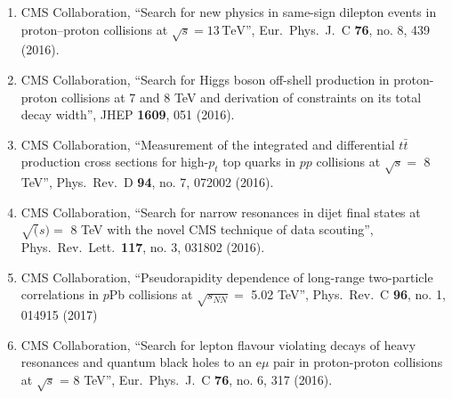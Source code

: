 \begin{itemize}
\begin{enumerate}
\item CMS Collaboration, ``Search for new physics in same-sign dilepton events in proton–proton collisions at $\sqrt{s} = 13\,\text {TeV} $'', Eur.\ Phys.\ J.\ C {\bf 76}, no. 8, 439 (2016).

\item CMS Collaboration, ``Search for Higgs boson off-shell production in proton-proton collisions at 7 and 8 TeV and derivation of constraints on its total decay width'', JHEP {\bf 1609}, 051 (2016).

\item CMS Collaboration, ``Measurement of the integrated and differential $t \bar t$ production cross sections for high-$p_t$ top quarks in $pp$ collisions at $\sqrt s =$ 8 TeV'', Phys.\ Rev.\ D {\bf 94}, no. 7, 072002 (2016).

\item CMS Collaboration, ``Search for narrow resonances in dijet final states at $\sqrt(s)=$ 8 TeV with the novel CMS technique of data scouting'', Phys.\ Rev.\ Lett.\  {\bf 117}, no. 3, 031802 (2016).

\item CMS Collaboration, ``Pseudorapidity dependence of long-range two-particle correlations in $p$Pb collisions at $\sqrt {s_{NN}}=$ 5.02 TeV'', Phys.\ Rev.\ C {\bf 96}, no. 1, 014915 (2017)

\item CMS Collaboration, ``Search for lepton flavour violating decays of heavy resonances and quantum black holes to an e$\mu$ pair in proton-proton collisions at $\sqrt{s}$ = 8 TeV'', Eur.\ Phys.\ J.\ C {\bf 76}, no. 6, 317 (2016).


\end{enumerate}
\end{itemize}
